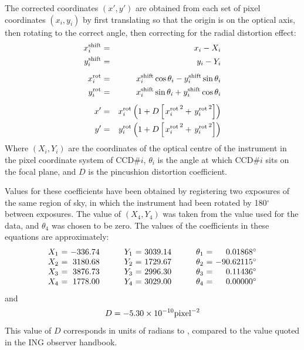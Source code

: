 \documentclass[11pt]{article}
\begin{document}
The corrected coordinates $(x', y')$ are obtained from 
each set of pixel coordinates $(x_i, y_i)$
by first translating so that the origin is on the optical
axis, then rotating to the correct angle, 
then correcting for the radial distortion effect:
\begin{eqnarray*}
  x_i^{\rm shift} & = & x_i - X_i \\
  y_i^{\rm shift} & = & y_i - Y_i \\[1ex]
%
  x_i^{\rm rot}   & = & x_i^{\rm shift} \cos \theta_i 
                      - y_i^{\rm shift} \sin \theta_i  \\
  y_i^{\rm rot}   & = & x_i^{\rm shift} \sin \theta_i 
                      + y_i^{\rm shift} \cos \theta_i  \\[1ex]
%
  x'              & = & x_i^{\rm rot} 
                        \left( 1 + D \left[ \left. x_i^{\rm rot} \right.^2 
                                          + \left. y_i^{\rm rot} \right.^2
                                     \right] \right)  \\
  y'              & = & y_i^{\rm rot} 
                        \left( 1 + D \left[ \left. x_i^{\rm rot} \right.^2
                                          + \left. y_i^{\rm rot} \right.^2
                                     \right] \right)
\end{eqnarray*}
Where $(X_i, Y_i)$ are the coordinates of the optical centre of
the instrument in the pixel coordinate system of CCD\#$i$,
$\theta_i$ is the angle at which CCD\#$i$ sits on the focal plane,
and $D$ is the pincushion distortion coefficient.

Values for these coefficients have been obtained by registering
two exposures of the same region of sky, in which the instrument
had been rotated by 180$^\circ$ between exposures.
The value of $(X_4, Y_4)$ was taken from the value used 
for the 
data, and $\theta_4$ was chosen to be zero.
The values of the coefficients in these equations are approximately:
\begin{displaymath}
  \begin{array}{c@{\ =\ }r@{\hspace{3em}}c@{\ =\ }r@{\hspace{3em}}c@{\ =\ }r}
     X_1 & -336.74  &  Y_1 & 3039.14  &  \theta_1 &   0.01868^\circ  \\
     X_2 & 3180.68  &  Y_2 & 1729.67  &  \theta_2 & -90.62115^\circ  \\
     X_3 & 3876.73  &  Y_3 & 2996.30  &  \theta_3 &   0.11436^\circ  \\
     X_4 & 1778.00  &  Y_4 & 3029.00  &  \theta_4 &   0.00000^\circ  
  \end{array}
\end{displaymath}
and
\begin{displaymath}
     D = -5.30 \times 10^{-10} {\rm pixel}^{-2}
\end{displaymath}
This value of $D$ corresponds in units of radians to 
, 
compared to the value 
quoted in the ING observer handbook.
\end{document}
